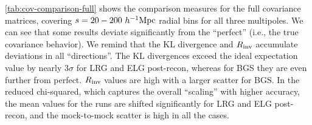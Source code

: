 \cref{tab:cov-comparison-full} shows the comparison measures for the full covariance matrices, covering $s=20-200~h^{-1}{\rm Mpc}$ radial bins for all three multipoles.
We can see that some \rascalc{} results deviate significantly from the ``perfect'' (i.e., the true covariance behavior).
We remind that the KL divergence and $R_{\rm inv}$ accumulate deviations in all ``directions''.
The KL divergences exceed the ideal expectation value by nearly $3\sigma$ for LRG and ELG post-recon, whereas for BGS they are even further from perfect.
$R_{\rm inv}$ values are high with a larger scatter for BGS.
In the reduced chi-squared, which captures the overall ``scaling'' with higher accuracy, the mean values for the \rascalc{} runs are shifted significantly for LRG and ELG post-recon, and the mock-to-mock scatter is high in all the cases.

